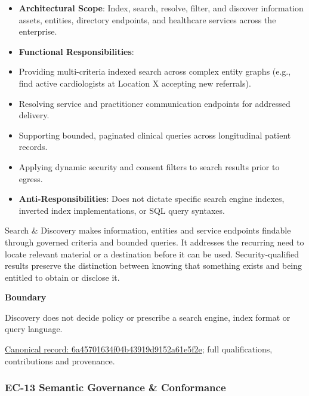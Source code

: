 \begin{itemize}


\item \textbf{Architectural Scope}: Index, search, resolve, filter, and discover information assets, entities, directory endpoints, and healthcare services across the enterprise.

\item \textbf{Functional Responsibilities}:

\item Providing multi-criteria indexed search across complex entity graphs (e.g., find active cardiologists at Location X accepting new referrals).

\item Resolving service and practitioner communication endpoints for addressed delivery.

\item Supporting bounded, paginated clinical queries across longitudinal patient records.

\item Applying dynamic security and consent filters to search results prior to egress.

\item \textbf{Anti-Responsibilities}: Does not dictate specific search engine indexes, inverted index implementations, or SQL query syntaxes.

\end{itemize}


Search \& Discovery makes information, entities and service endpoints findable through governed criteria and bounded queries. It addresses the recurring need to locate relevant material or a destination before it can be used. Security-qualified results preserve the distinction between knowing that something exists and being entitled to obtain or disclose it.



\textbf{Boundary}



Discovery does not decide policy or prescribe a search engine, index format or query language.


{\footnotesize \href{../../../../continuum/strategy/capability/6a45701634f04b43919d9152a61e5f2e.md}{Canonical record: 6a45701634f04b43919d9152a61e5f2e}; full qualifications, contributions and provenance.}\par
\subsubsection{EC-13 Semantic Governance \& Conformance}

